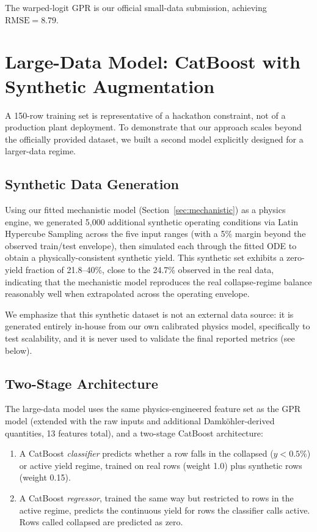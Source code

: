 \documentclass[11pt,a4paper]{article}
\newcommand{\rmse}{\text{RMSE}}
\begin{document}
The warped-logit GPR is our official small-data submission, achieving $\rmse = 8.79$.

\section{Large-Data Model: CatBoost with Synthetic Augmentation}
\label{sec:catboost}

A 150-row training set is representative of a hackathon constraint, not of a production plant
deployment. To demonstrate that our approach scales beyond the officially provided dataset, we
built a second model explicitly designed for a larger-data regime.

\subsection{Synthetic Data Generation}

Using our fitted mechanistic model (Section~\ref{sec:mechanistic}) as a physics engine, we
generated 5{,}000 additional synthetic operating conditions via Latin Hypercube Sampling across
the five input ranges (with a 5\% margin beyond the observed train/test envelope), then simulated
each through the fitted ODE to obtain a physically-consistent synthetic yield. This synthetic set
exhibits a zero-yield fraction of 21.8--40\%, close to the 24.7\% observed in the real data,
indicating that the mechanistic model reproduces the real collapse-regime balance reasonably
well when extrapolated across the operating envelope.

We emphasize that this synthetic dataset is not an external data source: it is generated entirely
in-house from our own calibrated physics model, specifically to test scalability, and it is
never used to validate the final reported metrics (see below).

\subsection{Two-Stage Architecture}

The large-data model uses the same physics-engineered feature set as the GPR model (extended with
the raw inputs and additional Damk\"{o}hler-derived quantities, 13 features total), and a
two-stage CatBoost architecture:

\begin{enumerate}[nosep]
  \item A CatBoost \emph{classifier} predicts whether a row falls in the collapsed ($y < 0.5\%$)
  or active yield regime, trained on real rows (weight 1.0) plus synthetic rows (weight 0.15).
  \item A CatBoost \emph{regressor}, trained the same way but restricted to rows in the active
  regime, predicts the continuous yield for rows the classifier calls active. Rows called
  collapsed are predicted as zero.
\end{enumerate}
\end{document}
